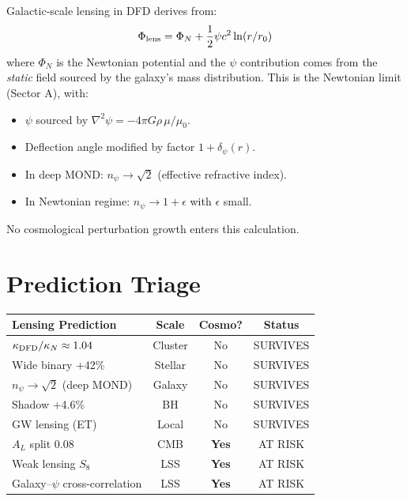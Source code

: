 \documentclass[11pt]{article}
\begin{document}
Galactic-scale lensing in DFD derives from:
\begin{equation}
\Phi_{\rm lens} = \Phi_N + \frac{1}{2}\psi c^2 \ln(r/r_0)
\end{equation}
where $\Phi_N$ is the Newtonian potential and the $\psi$ contribution
comes from the \emph{static} field sourced by the galaxy's mass
distribution. This is the Newtonian limit (Sector A), with:

\begin{itemize}
\item $\psi$ sourced by $\nabla^2\psi = -4\pi G\rho\,\mu/\mu_0$.
\item Deflection angle modified by factor $1 + \delta_\psi(r)$.
\item In deep MOND: $n_\psi \to \sqrt{2}$ (effective refractive index).
\item In Newtonian regime: $n_\psi \to 1 + \epsilon$ with $\epsilon$
  small.
\end{itemize}

No cosmological perturbation growth enters this calculation.

\section{Prediction Triage}

\begin{table}[h]
\centering
\begin{tabular}{lccc}
\toprule
\textbf{Lensing Prediction} & \textbf{Scale} & \textbf{Cosmo?} & \textbf{Status} \\
\midrule
$\kappa_{\rm DFD}/\kappa_N \approx 1.04$ & Cluster & No & SURVIVES \\
Wide binary +42\% & Stellar & No & SURVIVES \\
$n_\psi \to \sqrt{2}$ (deep MOND) & Galaxy & No & SURVIVES \\
Shadow +4.6\% & BH & No & SURVIVES \\
GW lensing (ET) & Local & No & SURVIVES \\
$A_L$ split 0.08 & CMB & \textbf{Yes} & AT RISK \\
Weak lensing $S_8$ & LSS & \textbf{Yes} & AT RISK \\
Galaxy--$\psi$ cross-correlation & LSS & \textbf{Yes} & AT RISK \\
\bottomrule
\end{tabular}
\end{table}
\end{document}
